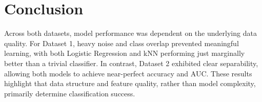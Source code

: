 \section{Conclusion}

Across both datasets, model performance was dependent on the underlying data quality. For Dataset 1, heavy noise and class overlap prevented meaningful learning, with both Logistic Regression and kNN performing just marginally better than a trivial classifier. In contrast, Dataset 2 exhibited clear separability, allowing both models to achieve near-perfect accuracy and AUC. These results highlight that data structure and feature quality, rather than model complexity, primarily determine classification success.